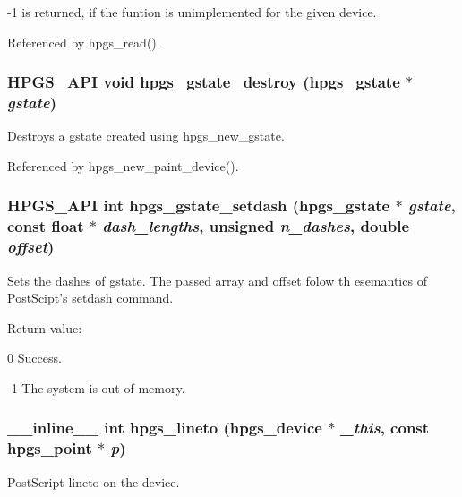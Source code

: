-\/1 is returned, if the funtion is unimplemented for the given device. 

Referenced by hpgs\_\-read().

\subsubsection[{hpgs\_\-gstate\_\-destroy}]{\setlength{\rightskip}{0pt plus 5cm}HPGS\_\-API void hpgs\_\-gstate\_\-destroy ({\bf hpgs\_\-gstate} $\ast$ {\em gstate})}\label{group__device_ga3a2f449b7ae7de3e4ef9a6afac3b526c}
Destroys a gstate created using {\ttfamily hpgs\_\-new\_\-gstate}. 

Referenced by hpgs\_\-new\_\-paint\_\-device().

\subsubsection[{hpgs\_\-gstate\_\-setdash}]{\setlength{\rightskip}{0pt plus 5cm}HPGS\_\-API int hpgs\_\-gstate\_\-setdash ({\bf hpgs\_\-gstate} $\ast$ {\em gstate}, \/  const float $\ast$ {\em dash\_\-lengths}, \/  unsigned {\em n\_\-dashes}, \/  double {\em offset})}\label{group__device_ga3d87c749cf3c6ade663c6319e11a33ce}
Sets the dashes of {\ttfamily gstate}. The passed array and offset folow th esemantics of PostScipt's {\ttfamily setdash} command.

Return value: \begin{DoxyItemize}
\item 0 Success. \item -\/1 The system is out of memory. \end{DoxyItemize}
\subsubsection[{hpgs\_\-lineto}]{\setlength{\rightskip}{0pt plus 5cm}\_\-\_\-inline\_\-\_\- int hpgs\_\-lineto ({\bf hpgs\_\-device} $\ast$ {\em \_\-this}, \/  const {\bf hpgs\_\-point} $\ast$ {\em p})\hspace{0.3cm}{\ttfamily  [static]}}\label{group__device_ga12162918d937d3248c8b28d505fb7d04}
PostScript lineto on the device. 


